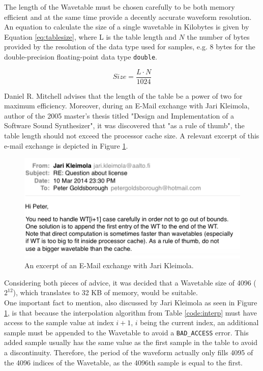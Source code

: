 \documentclass[12pt,twoside]{report}
\begin{document}
The length of the Wavetable must be chosen carefully to be both memory efficient and at the same time provide a decently accurate waveform resolution. An equation to calculate the size of a single wavetable in Kilobytes is given by Equation \ref{eq:tablesize}, where L is the table length and $N$ the number of bytes provided by the resolution of the data type used for samples, e.g. 8 bytes for the double-precision floating-point data type \texttt{double}.

\begin{equation}
  Size = \frac{L \cdot N}{1024}
  \label{eq:tablesize}
\end{equation}

\noindent Daniel R. Mitchell advises that the length of the table be a power of two for maximum efficiency.  Moreover, during an E-Mail exchange with Jari Kleimola, author of the 2005 master's thesis titled "Design and Implementation of a Software Sound Synthesizer", it was discovered that "as a rule of thumb", the table length should not exceed the processor cache size. A relevant excerpt of this e-mail exchange is depicted in Figure \ref{fig:jari}.

\begin{figure}
  \includegraphics[scale=0.7]{img/jari}
  \caption{An excerpt of an E-Mail exchange with Jari Kleimola.}
  \label{fig:jari}
\end{figure}

\noindent Considering both pieces of advice, it was decided that a Wavetable size of 4096 ($2^12$), which translates to 32 KB of memory, would be suitable.\\

\noindent One important fact to mention, also discussed by Jari Kleimola as seen in Figure \ref{fig:jari}, is that because the interpolation algorithm from Table \ref{code:interp} must have access to the sample value at index $i+1$, $i$ being the current index, an additional sample must be appended to the Wavetable to avoid a \texttt{BAD\_ACCESS} error. This added sample usually has the same value as the first sample in the table to avoid a discontinuity. Therefore, the period of the waveform actually only fills 4095 of the 4096 indices of the Wavetable, as the 4096th sample is equal to the first.
\end{document}

